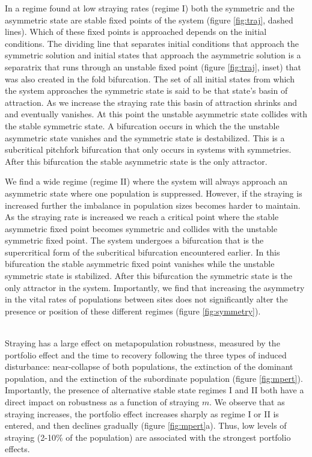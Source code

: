 \documentclass{revtex4}
\begin{document}
In a regime found at low straying rates (regime I) both the symmetric and the asymmetric state are stable fixed points of the system (figure \ref{fig:traj}, dashed lines). 
Which of these fixed points is approached depends on the initial conditions. 
The dividing line that separates initial conditions that approach the symmetric solution and initial states that approach the asymmetric solution is a separatrix that runs through an unstable fixed point (figure \ref{fig:traj}, inset) that was also created in the fold bifurcation. 
The set of all initial states from which the system approaches the symmetric state is said to be that state's basin of attraction. 
As we increase the straying rate this basin of attraction shrinks and and eventually vanishes. At this point the unstable asymmetric state collides with the stable symmetric state. 
A bifurcation occurs in which the the unstable asymmetric state vanishes and the symmetric state is destabilized. 
This is a subcritical pitchfork bifurcation that only occurs in systems with symmetries. 
After this bifurcation the stable asymmetric state is the only attractor. 

We find a wide regime (regime II) where the system will always approach an asymmetric state where one population is suppressed. 
However, if the straying is increased further the imbalance in population sizes becomes harder to maintain. 
As the straying rate is increased we reach a critical point where the stable asymmetric fixed point becomes symmetric and collides with the unstable symmetric fixed point. 
The system undergoes a bifurcation that is the supercritical form of the subcritical bifurcation encountered earlier. 
In this bifurcation the stable asymmetric fixed point vanishes while the unstable symmetric state is stabilized. 
After this bifurcation the symmetric state is the only attractor in the system.
Importantly, we find that increasing the asymmetry in the vital rates of populations between sites does not significantly alter the presence or position of these different regimes (figure \ref{fig:symmetry}).



 \\
Straying has a large effect on metapopulation robustness, measured by the portfolio effect and the time to recovery following the three types of induced disturbance: near-collapse of both populations, the extinction of the dominant population, and the extinction of the subordinate population (figure \ref{fig:mpert}).
Importantly, the presence of alternative stable state regimes I and II both have a direct impact on robustness as a function of straying $m$.
We observe that as straying increases, the portfolio effect increases sharply as regime I or II is entered, and then declines gradually (figure \ref{fig:mpert}a).
Thus, low levels of straying (2-10\% of the population) are associated with the strongest portfolio effects.
\end{document}
